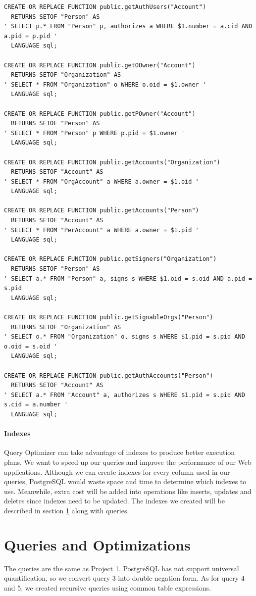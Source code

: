 \documentclass[11pt]{article}
\begin{document}
\begin{verbatim}
CREATE OR REPLACE FUNCTION public.getAuthUsers("Account")
  RETURNS SETOF "Person" AS
' SELECT p.* FROM "Person" p, authorizes a WHERE $1.number = a.cid AND a.pid = p.pid '
  LANGUAGE sql;

CREATE OR REPLACE FUNCTION public.getOOwner("Account")
  RETURNS SETOF "Organization" AS
' SELECT * FROM "Organization" o WHERE o.oid = $1.owner '
  LANGUAGE sql;

CREATE OR REPLACE FUNCTION public.getPOwner("Account")
  RETURNS SETOF "Person" AS
' SELECT * FROM "Person" p WHERE p.pid = $1.owner '
  LANGUAGE sql;

CREATE OR REPLACE FUNCTION public.getAccounts("Organization")
  RETURNS SETOF "Account" AS
' SELECT * FROM "OrgAccount" a WHERE a.owner = $1.oid '
  LANGUAGE sql;

CREATE OR REPLACE FUNCTION public.getAccounts("Person")
  RETURNS SETOF "Account" AS
' SELECT * FROM "PerAccount" a WHERE a.owner = $1.pid '
  LANGUAGE sql;

CREATE OR REPLACE FUNCTION public.getSigners("Organization")
  RETURNS SETOF "Person" AS
' SELECT a.* FROM "Person" a, signs s WHERE $1.oid = s.oid AND a.pid = s.pid '
  LANGUAGE sql;

CREATE OR REPLACE FUNCTION public.getSignableOrgs("Person")
  RETURNS SETOF "Organization" AS
' SELECT o.* FROM "Organization" o, signs s WHERE $1.pid = s.pid AND o.oid = s.oid '
  LANGUAGE sql;

CREATE OR REPLACE FUNCTION public.getAuthAccounts("Person")
  RETURNS SETOF "Account" AS
' SELECT a.* FROM "Account" a, authorizes s WHERE $1.pid = s.pid AND s.cid = a.number '
  LANGUAGE sql;
\end{verbatim}

\paragraph{Indexes} Query Optimizer can take advantage of indexes to produce better execution plans. We want to speed up our queries and improve the performance of our Web applications. Although we can create indexes for every column used in our queries, PostgreSQL would waste space and time to determine which indexes to use. Meanwhile, extra cost will be added into operations like inserts, updates and deletes since indexes need to be updated. The indexes we created will be described in section \ref{sec:qando} along with queries.

\section{Queries and Optimizations}
\label{sec:qando}
The queries are the same as Project 1. PostgreSQL has not support universal quantification, so we convert query 3 into double-negation form. As for query 4 and 5, we created recursive queries using common table expressions.
\end{document}
